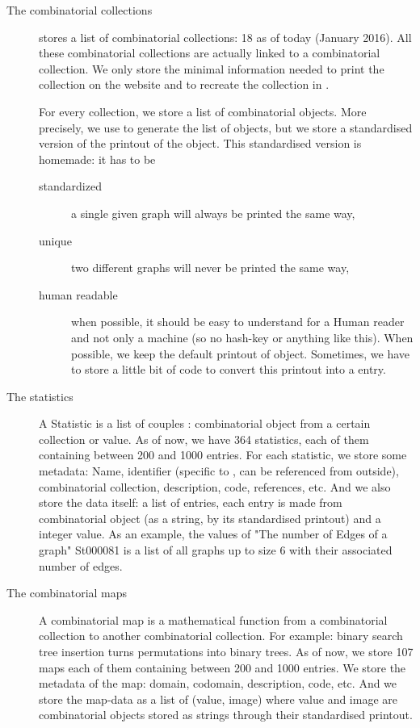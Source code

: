 \begin{description}
\item[The combinatorial collections] \FindStat stores a list of combinatorial collections: 18 as of today (January 2016). All these combinatorial collections are actually linked to a \SageMath combinatorial collection. We only store the minimal  information needed to print the collection on the website and to recreate the collection in \SageMath.

For every collection, we store a list of combinatorial objects. More precisely, we use \SageMath to generate the list of objects,
but we store a standardised version of the printout of the object. This standardised version is homemade: it has to be
\begin{description}
\item[standardized] a single given graph will always be printed the same way,
\item[unique] two different graphs will never be printed the same way,
\item[human readable] when possible, it should be easy to understand for a Human reader and not only a machine (so no hash-key or anything like this).
When possible, we keep the default printout of \SageMath object. Sometimes, we have to store a little bit of code to convert this printout into a
\SageMath entry.
\end{description}

\item[The statistics] A Statistic is a list of couples : combinatorial object from a certain collection or value. As of now, we have 364 statistics,
each of them containing between 200 and 1000 entries. For each statistic, we store some metadata: Name, identifier
(specific to \FindStat, can be referenced from outside), combinatorial collection, description, code, references, etc. And we also store the data itself: a list of entries,
each entry is made from combinatorial object (as a string, by its standardised printout) and a integer value. As an example, the values of "The number of Edges of a graph"
St000081 is a list of all graphs up to size 6 with their associated number of edges.

\item[The combinatorial maps] A combinatorial map is a mathematical function from a combinatorial collection to another combinatorial collection. For example: binary search
tree insertion turns permutations into binary trees. As of now, we store 107 maps each of them containing between 200 and 1000 entries. We store the metadata of the map: domain, codomain, description, code, etc. And we store the map-data as a list of (value, image)
where value and image are combinatorial objects stored as strings through their standardised printout.
\end{description}

